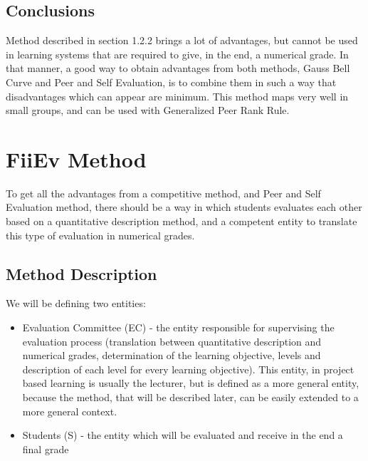\subsection{Conclusions}
Method described in section 1.2.2 brings a lot of advantages, but cannot be used in learning systems that are required to give, in the end, a numerical grade. In that manner, a good way to obtain advantages from both methods, Gauss Bell Curve and Peer and Self Evaluation, is to combine them in such a way that disadvantages which can appear are minimum. This method maps very well in small groups, and can be used with Generalized Peer Rank Rule.

\section{FiiEv Method}
To get all the advantages from a competitive method, and Peer and Self Evaluation method, there should be a way in which students evaluates each other based on a quantitative description method, and a competent entity to translate this type of evaluation in numerical grades.

\subsection{Method Description}
We will be defining two entities:
\begin{itemize}
	\item Evaluation Committee (EC) - the entity responsible for supervising the evaluation process (translation between quantitative description and numerical grades, determination of the learning objective, levels and description of each level for every learning objective). This entity, in project based learning is usually the lecturer, but is defined as a more general entity, because the method, that will be described later, can be easily extended to a more general context.
	\item Students (S) - the entity which will be evaluated and receive in the end a final grade
\end{itemize}

